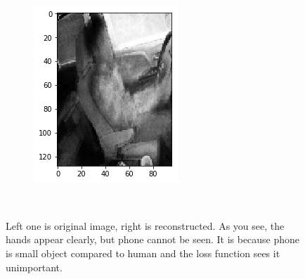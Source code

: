 \documentclass[12pt, letterpaper]{article}
\begin{document}
\begin{figure}[H]
    ~ %
    \begin{subfigure}[b]{0.3\textwidth}
        \includegraphics[width=\textwidth]{ae-r1}
        \label{fig:tiger}
    \end{subfigure}
    ~ %
    \caption{Left one is original image, right is reconstructed. As you see, the hands appear clearly, but phone cannot be seen. It is because phone is small object compared to human and the loss function sees it unimportant.}
  \label{fig:animals}
\end{figure}
\end{document}

